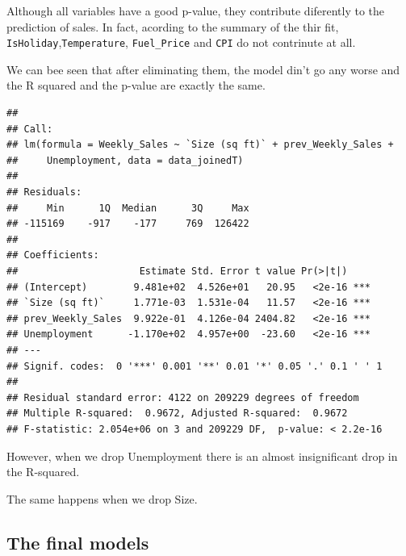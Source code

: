 \documentclass[11pt,]{article}
\newenvironment{Shaded}{\begin{snugshade}}{\end{snugshade}}
\newcommand{\KeywordTok}[1]{\textcolor[rgb]{0.13,0.29,0.53}{\textbf{{#1}}}}
\newcommand{\DataTypeTok}[1]{\textcolor[rgb]{0.13,0.29,0.53}{{#1}}}
\newcommand{\StringTok}[1]{\textcolor[rgb]{0.31,0.60,0.02}{{#1}}}
\newcommand{\CommentTok}[1]{\textcolor[rgb]{0.56,0.35,0.01}{\textit{{#1}}}}
\newcommand{\NormalTok}[1]{{#1}}
\begin{document}
Although all variables have a good p-value, they contribute diferently
to the prediction of sales. In fact, acording to the summary of the thir
fit, \texttt{IsHoliday},\texttt{Temperature}, \texttt{Fuel\_Price} and
\texttt{CPI} do not contrinute at all.

We can bee seen that after eliminating them, the model din't go any
worse and the R squared and the p-value are exactly the same.

\begin{Shaded}
\end{Shaded}

\begin{verbatim}
## 
## Call:
## lm(formula = Weekly_Sales ~ `Size (sq ft)` + prev_Weekly_Sales + 
##     Unemployment, data = data_joinedT)
## 
## Residuals:
##     Min      1Q  Median      3Q     Max 
## -115169    -917    -177     769  126422 
## 
## Coefficients:
##                     Estimate Std. Error t value Pr(>|t|)    
## (Intercept)        9.481e+02  4.526e+01   20.95   <2e-16 ***
## `Size (sq ft)`     1.771e-03  1.531e-04   11.57   <2e-16 ***
## prev_Weekly_Sales  9.922e-01  4.126e-04 2404.82   <2e-16 ***
## Unemployment      -1.170e+02  4.957e+00  -23.60   <2e-16 ***
## ---
## Signif. codes:  0 '***' 0.001 '**' 0.01 '*' 0.05 '.' 0.1 ' ' 1
## 
## Residual standard error: 4122 on 209229 degrees of freedom
## Multiple R-squared:  0.9672, Adjusted R-squared:  0.9672 
## F-statistic: 2.054e+06 on 3 and 209229 DF,  p-value: < 2.2e-16
\end{verbatim}

However, when we drop Unemployment there is an almost insignificant drop
in the R-squared.

The same happens when we drop Size.

\subsection{The final models}\label{the-final-models}
\end{document}
